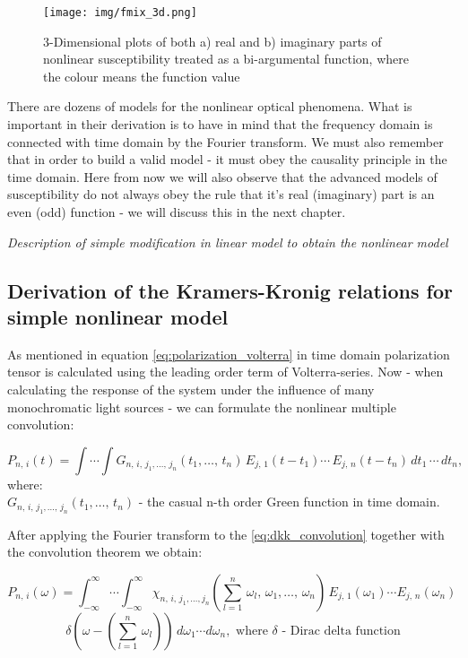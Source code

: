 \documentclass[12pt,twoside,a4paper]{article}
\numberwithin{equation}{subsection}
\numberwithin{figure}{subsection}
\begin{document}
\begin{figure} 
  \texttt{[image: img/fmix\_3d.png]}
  \caption{3-Dimensional plots of both a) real and b) imaginary parts of nonlinear susceptibility treated as a bi-argumental
  function, where the colour means the function value \label{fig:fmix_3d}}
\end{figure}

There are dozens of models for the nonlinear optical phenomena. What is important in their derivation is to have in mind that the
frequency domain is connected with time domain by the Fourier transform. We must also remember that in order to build a valid model
- it must obey the causality principle in the time domain. Here from now we will also observe that the advanced models of
susceptibility do not always obey the rule that it's real (imaginary) part is an even (odd) function - we will discuss this in the next chapter.

\textit{Description of simple modification in linear model to obtain the nonlinear model}

\subsection{Derivation of the Kramers-Kronig relations for simple nonlinear model} \label{chap:problem_dnlo}

As mentioned in equation \ref{eq:polarization_volterra} in time domain polarization tensor is calculated using the leading order
term of Volterra-series. Now - when calculating the response of the system under the influence of many monochromatic light sources
- we can formulate the nonlinear multiple convolution:

\begin{equation} \label{eq:dkk_convolution}
  {P_{n, \,i}}(t)=\int \dotsi \int {G_{n, \,i, \,j_{1},\dotsc, \,j_{n}}}(t_1,\dotsc, \, t_n )\,{E_{j,
  \,1}}(t - {t_{1}})\dotsm\,{E_{j, \,n}}(t -{t_{n}})\,d{t_{1}}\,\dotsm\,d{t_{n}},
\end{equation}
where:\\
${G_{n, \,i, \,j_{1},\dotsc, \, j_{n}}}(t_1, \dotsc, \, t_n)$ - the casual n-th order Green function in
time domain.

After applying the Fourier transform to the \ref{eq:dkk_convolution} together with the convolution theorem we obtain:

\begin{equation} \label{eq:dkk_fapplied}
  {P_{n, \,i}}(\omega )=\int_{ - \infty }^{\infty } \dotsi\int_{ - \infty}^{\infty }{\chi_{n, \,i,
  \,{j_{1}}, \dotsc,{j_{n}}}}(\sum_{l=1}^{n}\,{\omega_{l}}, \,{\omega_{1}},\dotsc,\,{\omega_{n}
  })\,{E_{j, \,1}}({\omega_{1}})\dotsm {E_{j,\,n}}({\omega_{n}}) \, 
\end{equation}
\begin{equation*}
  \delta (\omega - (\sum_{l=1}^{n}\,{\omega_{l}}))\,d{\omega_{1}}\dotsm d{\omega_{n}}, 
  \mbox { where $\delta$ - Dirac delta   function}
\end{equation*}
\end{document}
